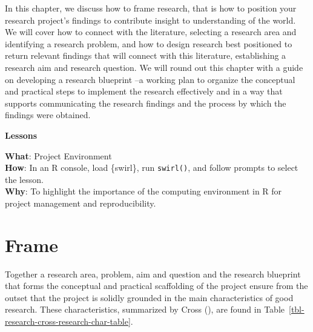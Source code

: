 \documentclass[
  letterpaper,
]{book}
\theoremstyle{definition}
\theoremstyle{remark}
\begin{document}
In this chapter, we discuss how to frame research, that is how to
position your research project's findings to contribute insight to
understanding of the world. We will cover how to connect with the
literature, selecting a research area and identifying a research
problem, and how to design research best positioned to return relevant
findings that will connect with this literature, establishing a research
aim and research question. We will round out this chapter with a guide
on developing a research blueprint --a working plan to organize the
conceptual and practical steps to implement the research effectively and
in a way that supports communicating the research findings and the
process by which the findings were obtained.

\begin{tcolorbox}[enhanced jigsaw, breakable, colframe=quarto-callout-color-frame, toprule=.15mm, arc=.35mm, colback=white, left=2mm, bottomrule=.15mm, rightrule=.15mm, opacityback=0, leftrule=.75mm]

\textbf{ Lessons}

\textbf{What}: Project Environment\\
\textbf{How}: In an R console, load \{swirl\}, run \texttt{swirl()}, and
follow prompts to select the lesson.\\
\textbf{Why}: To highlight the importance of the computing environment
in R for project management and reproducibility.

\end{tcolorbox}

\section{Frame}\label{sec-research-frame}

Together a research area, problem, aim and question and the research
blueprint that forms the conceptual and practical scaffolding of the
project ensure from the outset that the project is solidly grounded in
the main characteristics of good research. These characteristics,
summarized by Cross (), are found in
Table~\ref{tbl-research-cross-research-char-table}.
\end{document}
